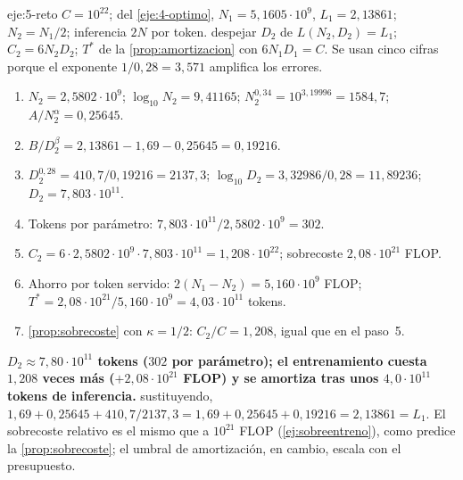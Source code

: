 \begin{solucion}{eje:5-reto}
\datos $C=10^{22}$; del \cref{eje:4-optimo}, $N_1=5{,}1605\cdot 10^{9}$, $L_1=2{,}13861$; $N_2=N_1/2$; inferencia $2N$ por token.
\planteamiento despejar $D_2$ de $L(N_2,D_2)=L_1$; $C_2=6N_2D_2$; $T^{*}$ de la \cref{prop:amortizacion} con $6N_1D_1=C$. Se usan cinco cifras porque el exponente $1/0{,}28=3{,}571$ amplifica los errores.
\pasos
\begin{enumerate}[label=\arabic*.]
  \item $N_2=2{,}5802\cdot 10^{9}$; $\log_{10}N_2=9{,}41165$; $N_2^{0{,}34}=10^{3{,}19996}=1584{,}7$; $A/N_2^{\alpha}=0{,}25645$.
  \item $B/D_2^{\beta}=2{,}13861-1{,}69-0{,}25645=0{,}19216$.
  \item $D_2^{0{,}28}=410{,}7/0{,}19216=2137{,}3$; $\log_{10}D_2=3{,}32986/0{,}28=11{,}89236$; $D_2=7{,}803\cdot 10^{11}$.
  \item Tokens por parámetro: $7{,}803\cdot 10^{11}/2{,}5802\cdot 10^{9}=302$.
  \item $C_2=6\cdot 2{,}5802\cdot 10^{9}\cdot 7{,}803\cdot 10^{11}=1{,}208\cdot 10^{22}$; sobrecoste $2{,}08\cdot 10^{21}$ FLOP.
  \item Ahorro por token servido: $2(N_1-N_2)=5{,}160\cdot 10^{9}$ FLOP; $T^{*}=2{,}08\cdot 10^{21}/5{,}160\cdot 10^{9}=4{,}03\cdot 10^{11}$ tokens.
  \item \cref{prop:sobrecoste} con $\kappa=1/2$: $C_2/C=1{,}208$, igual que en el paso~5.
\end{enumerate}
\resultado \textbf{$D_2\approx 7{,}80\cdot 10^{11}$ tokens ($302$ por parámetro); el entrenamiento cuesta $1{,}208$ veces más ($+2{,}08\cdot 10^{21}$ FLOP) y se amortiza tras unos $4{,}0\cdot 10^{11}$ tokens de inferencia.}
\comprobacion sustituyendo, $1{,}69+0{,}25645+410{,}7/2137{,}3=1{,}69+0{,}25645+0{,}19216=2{,}13861=L_1$. El sobrecoste relativo es el mismo que a $10^{21}$ FLOP (\cref{ej:sobreentreno}), como predice la \cref{prop:sobrecoste}; el umbral de amortización, en cambio, escala con el presupuesto.
\end{solucion}

